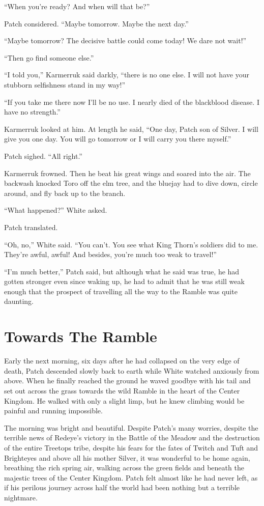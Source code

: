 \documentclass[12pt]{memoir}
\begin{document}
“When you’re ready? And when will that be?”

Patch considered. “Maybe tomorrow. Maybe the next day.”

“Maybe tomorrow? The decisive battle could come today! We dare not
wait!”

“Then go find someone else.”

“I told you,” Karmerruk said darkly, “there is no one else. I will not
have your stubborn selfishness stand in my way!”

“If you take me there now I’ll be no use. I nearly died of the
blackblood disease. I have no strength.”

Karmerruk looked at him. At length he said, “One day, Patch son of
Silver. I will give you one day. You will go tomorrow or I will carry
you there myself.”

Patch sighed. “All right.”

Karmerruk frowned. Then he beat his great wings and soared into the
air. The backwash knocked Toro off the elm tree, and the bluejay had
to dive down, circle around, and fly back up to the branch.

“What happened?” White asked.

Patch translated.

“Oh, no,” White said. “You can’t. You see what King Thorn’s soldiers
did to me. They’re awful, awful! And besides, you’re much too weak to
travel!”

“I’m much better,” Patch said, but although what he said was true, he
had gotten stronger even since waking up, he had to admit that he was
still weak enough that the prospect of travelling all the way to the
Ramble was quite daunting.


\section{Towards The Ramble}

Early the next morning, six days after he had collapsed on the very
edge of death, Patch descended slowly back to earth while White
watched anxiously from above. When he finally reached the ground he
waved goodbye with his tail and set out across the grass towards the
wild Ramble in the heart of the Center Kingdom. He walked with only a
slight limp, but he knew climbing would be painful and running
impossible.

The morning was bright and beautiful. Despite Patch’s many worries,
despite the terrible news of Redeye’s victory in the Battle of the
Meadow and the destruction of the entire Treetops tribe, despite his
fears for the fates of Twitch and Tuft and Brighteyes and above all
his mother Silver, it was wonderful to be home again, breathing the
rich spring air, walking across the green fields and beneath the
majestic trees of the Center Kingdom. Patch felt almost like he had
never left, as if his perilous journey across half the world had been
nothing but a terrible nightmare.
\end{document}
